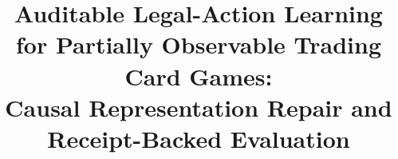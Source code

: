 \title{Auditable Legal-Action Learning for Partially Observable Trading Card Games:\\
Causal Representation Repair and Receipt-Backed Evaluation}

\author{
}
